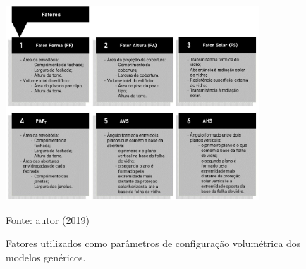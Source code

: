     \begin{figure}[ht]
        \centering
        \small \caption{Fatores utilizados como parâmetros de configuração volumétrica dos modelos genéricos.}
        \includegraphics[width=0.85\textwidth]{figures/fig10_Fluxogramas-2.jpg}
        \begin{flushleft}
            \par \small Fonte: autor (2019)
        \end{flushleft}
        \label{fig:figura8}
    \end{figure}

